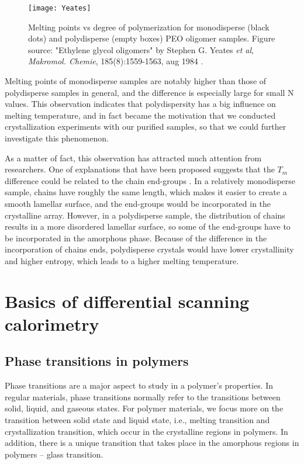 \begin{figure}[H]
\center
\vspace{1 cm}
\texttt{[image: Yeates]}
\caption[Melting points vs degree of polymerization for monodisperse (black dots) and polydisperse (empty boxes) PEO oligomer samples.]{Melting points vs degree of polymerization for monodisperse (black dots) and polydisperse (empty boxes) PEO oligomer samples. Figure source: "Ethylene glycol oligomers" by Stephen G. Yeates \textit{et al}, \textit{Makromol. Chemie}, 185(8):1559-1563, aug 1984 \cite{Yeates1984}.}
\label{fig:Yeates}
\end{figure}

Melting points of monodisperse samples are notably higher than those of polydisperse samples in general, and the difference is especially large for small N values. This observation indicates that polydispersity has a big influence on melting temperature, and in fact became the motivation that we conducted crystallization experiments with our purified samples, so that we could further investigate this phenomenon.

As a matter of fact, this observation has attracted much attention from researchers. One of explanations that have been proposed suggests that the $T_{m}$ difference could be related to the chain end-groups \cite{Percec1989}. In a relatively monodisperse sample, chains have roughly the same length, which makes it easier to create a smooth lamellar surface, and the end-groups would be incorporated in the crystalline array. However, in a polydisperse sample, the distribution of chains results in a more disordered lamellar surface, so some of the end-groups have to be incorporated in the amorphous phase. Because of the difference in the incorporation of chains ends, polydisperse crystals would have lower crystallinity and higher entropy, which leads to a higher melting temperature.

\section{Basics of differential scanning calorimetry}

\subsection{Phase transitions in polymers}

Phase transitions are a major aspect to study in a polymer's properties. In regular materials, phase transitions normally refer to the transitions between solid, liquid, and gaseous states. For polymer materials, we focus more on the transition between solid state and liquid state, i.e., melting transition and crystallization transition, which occur in the crystalline regions in polymers. In addition, there is a unique transition that takes place in the amorphous regions in polymers -- glass transition.

